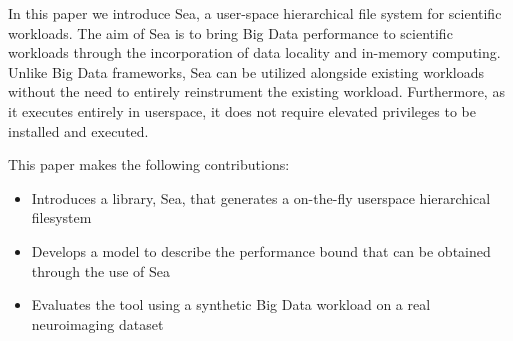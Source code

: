 
In this paper we introduce Sea, a user-space hierarchical file system for
scientific workloads. The aim of Sea is to bring Big Data performance to
scientific workloads through the incorporation of data locality and in-memory
computing. Unlike Big Data frameworks, Sea can be utilized alongside existing
workloads without the need to entirely reinstrument the existing workload.
Furthermore, as it executes entirely in userspace, it does not require elevated
privileges to be installed and executed.

This paper makes the following contributions:
\begin{itemize}
    \item Introduces a library, Sea, that generates a on-the-fly userspace
    hierarchical filesystem
    \item Develops a model to describe the performance bound that can be
    obtained through the use of Sea
    \item Evaluates the tool using a synthetic Big Data workload on a real
    neuroimaging dataset
\end{itemize}







